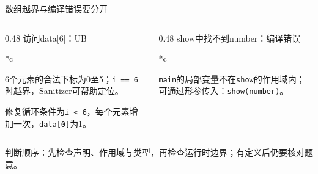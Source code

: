 \begin{frame}{数组越界与编译错误要分开}
    \begin{columns}[T]
        \begin{column}{0.48\textwidth}
            \small \alert{访问data[6]：UB}
            \begin{Code}*{c}
                
            \end{Code}
            \small 6个元素的合法下标为0至5；\texttt{i == 6}时越界，Sanitizer可帮助定位。
            \par\medskip
            修复循环条件为\texttt{i < 6}，每个元素增加一次，\texttt{data[0]}为1。
        \end{column}
        \begin{column}{0.48\textwidth}
            \small \alert{show中找不到number：编译错误}
            \begin{Code}*{c}
                
            \end{Code}
            \small \texttt{main}的局部变量不在\texttt{show}的作用域内；可通过形参传入：\texttt{show(number)}。
        \end{column}
    \end{columns}
    \medskip
    \footnotesize 判断顺序：先检查声明、作用域与类型，再检查运行时边界；\alert{有定义后仍要核对题意。}
\end{frame}
